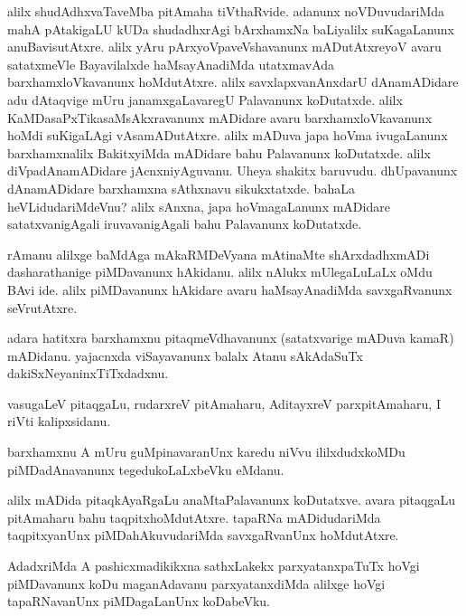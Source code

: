 \begin{mng}
alilx shudAdhxvaTaveMba pitAmaha tiVthaRvide. adanunx noVDuvudariMda mahA pAtakigaLU kUDa shudadhxrAgi bArxhamxNa baLiyalilx suKagaLanunx anuBavisutAtxre. alilx yAru pArxyoVpaveVshavanunx mADutAtxreyoV avaru satatxmeVle Bayavilalxde haMsayAnadiMda utatxmavAda barxhamxloVkavanunx hoMdutAtxre. alilx savxlapxvanAnxdarU dAnamADidare adu dAtaqvige mUru janamxgaLavaregU Palavanunx koDutatxde. alilx KaMDasaPxTikasaMsAkxravanunx mADidare avaru barxhamxloVkavanunx hoMdi suKigaLAgi vAsamADutAtxre. alilx mADuva japa hoVma ivugaLanunx barxhamxnalilx BakitxyiMda mADidare bahu Palavanunx koDutatxde. alilx diVpadAnamADidare jAcnxniyAguvanu. Uheya shakitx baruvudu. dhUpavanunx dAnamADidare barxhamxna sAthxnavu sikukxtatxde. bahaLa heVLidudariMdeVnu? alilx sAnxna, japa hoVmagaLanunx mADidare satatxvanigAgali iruvavanigAgali bahu Palavanunx koDutatxde.
\end{mng}

\begin{mng}
rAmanu alilxge baMdAga mAkaRMDeVyana mAtinaMte shArxdadhxmADi dasharathanige piMDavanunx hAkidanu. alilx nAlukx mUlegaLuLaLx oMdu BAvi ide. alilx piMDavanunx hAkidare avaru haMsayAnadiMda savxgaRvanunx seVrutAtxre.
\end{mng}

\begin{mng}
adara hatitxra barxhamxnu pitaqmeVdhavanunx (satatxvarige mADuva kamaR) mADidanu. yajacnxda viSayavanunx balalx Atanu sAkAdaSuTx dakiSxNeyaninxTiTxdadxnu.
\end{mng}

\begin{mng}
vasugaLeV pitaqgaLu, rudarxreV pitAmaharu, AditayxreV parxpitAmaharu, I riVti kalipxsidanu.
\end{mng}

\begin{mng}
barxhamxnu A mUru guMpinavaranUnx karedu niVvu ililxdudxkoMDu piMDadAnavanunx tegedukoLaLxbeVku eMdanu.
\end{mng}

\begin{mng}
alilx mADida pitaqkAyaRgaLu anaMtaPalavanunx koDutatxve. avara pitaqgaLu pitAmaharu bahu taqpitxhoMdutAtxre. tapaRNa mADidudariMda taqpitxyanUnx piMDahAkuvudariMda savxgaRvanUnx hoMdutAtxre.
\end{mng}

\begin{mng}
AdadxriMda A pashicxmadikikxna sathxLakekx parxyatanxpaTuTx hoVgi piMDavanunx koDu maganAdavanu parxyatanxdiMda alilxge hoVgi tapaRNavanUnx piMDagaLanUnx koDabeVku.
\end{mng}

